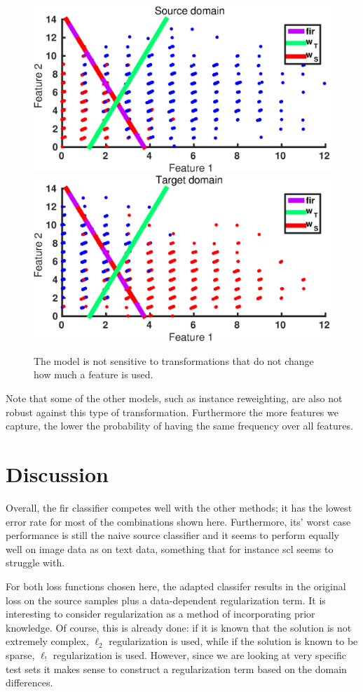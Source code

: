 \documentclass[twoside,11pt]{article}
\begin{document}
\begin{figure}[ht]
	\centering
	\includegraphics[width=.45\textwidth]{images/da_artexp_sens_model_2.eps}
	\includegraphics[width=.45\textwidth]{images/da_artexp_sens_model_3.eps}
	\caption{The model is not sensitive to transformations that do not change how much a feature is used.}
	\label{sens_model}
\end{figure}

Note that some of the other models, such as instance reweighting, are also not robust against this type of transformation. Furthermore the more features we capture, the lower the probability of having the same frequency over all features.

\section{Discussion}
Overall, the {\sc fir} classifier competes well with the other methods; it has the lowest error rate for most of the combinations shown here. Furthermore, its' worst case performance is still the naive source classifier and it seems to perform equally well on image data as on text data, something that for instance {\sc scl} seems to struggle with.

For both loss functions chosen here, the adapted classifer results in the original loss on the source samples plus a data-dependent regularization term. It is interesting to consider regularization as a method of incorporating prior knowledge. Of course, this is already done: if it is known that the solution is not extremely complex, $\ell_{2}$ regularization is used, while if the solution is known to be sparse, $\ell_{!}$ regularization is used. However, since we are looking at very specific test sets it makes sense to construct a regularization term based on the domain differences.
\end{document}
